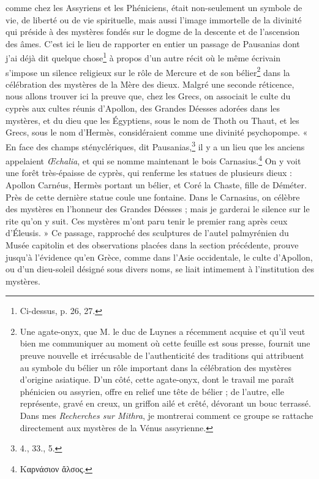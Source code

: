 \documentclass{article}
\begin{document}
comme chez les Assyriens et les Phéniciens, était non-seulement un symbole de vie, de liberté ou de vie spirituelle, mais aussi l'image immortelle de la divinité qui préside à des mystères fondés sur le dogme de la descente et de l'ascension des âmes. C'est ici le lieu de rapporter en entier un passage de Pausanias dont j'ai déjà dit quelque chose\footnote{Ci-dessus, p. 26, 27.} à propos d'un autre récit où le même écrivain s'impose un silence religieux sur le rôle de Mercure et de son bélier\footnote{Une agate-onyx, que M. le duc de Luynes a récemment acquise et qu'il veut bien me communiquer au moment où cette feuille est sous presse, fournit une preuve nouvelle et irrécusable de l'authenticité des traditions qui attribuent au symbole du bélier un rôle important dans la célébration des mystères d'origine asiatique. D'un côté, cette agate-onyx, dont le travail me paraît phénicien ou assyrien, offre en relief une tête de bélier ; de l'autre, elle représente, gravé en creux, un griffon ailé et crêté, dévorant un bouc terrassé. Dans mes \emph{Recherches sur Mithra}, je montrerai comment ce groupe se rattache directement aux mystères de la Vénus assyrienne.} dans la célébration des mystères de la Mère des dieux. Malgré une seconde réticence, nous allons trouver ici la preuve que, chez les Grecs, on associait le culte du cyprès aux cultes réunis d'Apollon, des Grandes Déesses adorées dans les mystères, et du dieu que les Égyptiens, sous le nom de Thoth ou Thaut, et les Grecs, sous le nom d'Hermès, considéraient comme une divinité psychopompe. « En face des champs stényclériques, dit Pausanias,\footnote{4., 33., 5.} il y a un lieu que les anciens appelaient \emph{Œchalia}, et qui se nomme maintenant le bois Carnasius.\footnote{\textgreek{Καρνάσιον ἄλσος}.} On y voit une forêt très-épaisse de cyprès, qui renferme les statues de plusieurs dieux : Apollon Carnéus, Hermès portant un bélier, et Coré la Chaste, fille de Déméter. Près de cette dernière statue coule une fontaine. Dans le Carnasius, on célèbre des mystères en l'honneur des Grandes Déesses ; mais je garderai le silence sur le rite qu'on y suit. Ces mystères m'ont paru tenir le premier rang après ceux d'Éleusis. » Ce passage, rapproché des sculptures de l'autel palmyrénien du Musée capitolin et des observations placées dans la section précédente, prouve jusqu'à l'évidence qu'en Grèce, comme dans l'Asie occidentale, le culte d'Apollon, ou d'un dieu-soleil désigné sous divers noms, se liait intimement à l'institution des mystères.
\end{document}
